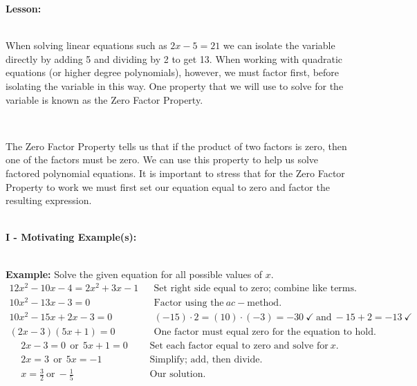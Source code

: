 \documentclass[12pt]{article}
\theoremstyle{definition}
\begin{document}
{\bf Lesson:}\\
\ \par
When solving linear equations such as $2 x - 5 = 21$ we can isolate the variable directly by adding 5 and dividing by 2 to get 13. When working with quadratic equations (or higher degree polynomials), however, we must factor first, before isolating the variable in this way.  One property that we will use to solve for the variable is known as the Zero Factor Property.\\
\begin{center}
\end{center}
\ \par
The Zero Factor Property tells us that if the product of two factors is zero, then one of the factors must be zero.  We can use this property to help us solve factored polynomial equations.  It is important to stress that for the Zero Factor Property to work we must first set our equation equal to zero and factor the resulting expression.\\
\ \par
{\bf I - Motivating Example(s):}\\
\ \par
{\bf Example:} Solve the given equation for all possible values of $x$.
  \begin{eqnarray*}
12x^2-10x-4=2x^2+3x-1 & & \text{Set right side equal to zero; combine like terms.}\\
10x^2-13x-3=0 & & \text{Factor using the} \ ac-\text{method.}\\
10x^2-15x+2x-3=0 & & (-15)\cdot 2=(10)\cdot(-3)=-30 \ \checkmark \ \text{and} \ -15+2=-13 \ \checkmark\\
    (2 x - 3) (5 x + 1) = 0~~~ &  & \text{One factor must equal zero for the equation to hold.}%
\end{eqnarray*}
\begin{eqnarray*}
    2 x - 3 = 0 \ \ \text{or} \ \ 5 x + 1 = 0~~~ &  & \text{Set each factor equal to zero and solve for} \ x.\\
    2 x = 3 \ \ \text{or} \ \ 5 x = - 1~ &  & \text{Simplify; add, then divide.}\\
    x = \frac{3}{2} \ \text{or} \ -\frac{1}{5}~~~~~ &  & \text{Our solution.}
  \end{eqnarray*}
\end{document}
